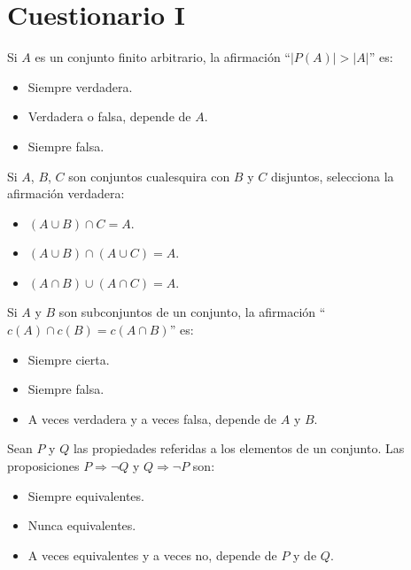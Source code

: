 \section{Cuestionario I}
\begin{ejercicio}
    Si $A$ es un conjunto finito arbitrario, la afirmación ``$|P(A)| > |A|$'' es:
    \begin{itemize}
        \item Siempre verdadera.
        \item Verdadera o falsa, depende de $A$.
        \item Siempre falsa.
    \end{itemize}
\end{ejercicio}

\begin{ejercicio}
    Si $A$, $B$, $C$ son conjuntos cualesquira con $B$ y $C$ disjuntos, selecciona la afirmación verdadera:
    \begin{itemize}
        \item $(A \cup B)\cap C = A$.
        \item $(A \cup B)\cap (A \cup C)=A$.
        \item $(A\cap B)\cup(A \cap C)=A$.
    \end{itemize}
\end{ejercicio}

\begin{ejercicio}
    Si $A$ y $B$ son subconjuntos de un conjunto, la afirmación \newline ``$c(A) \cap c(B) = c(A \cap B)$'' es:
    \begin{itemize}
        \item Siempre cierta.
        \item Siempre falsa.
        \item A veces verdadera y a veces falsa, depende de $A$ y $B$.
    \end{itemize}
\end{ejercicio}

\begin{ejercicio}
    Sean $P$ y $Q$ las propiedades referidas a los elementos de un conjunto. Las proposiciones $P \Rightarrow \neg Q$ y $Q \Rightarrow \neg P$ son:
    \begin{itemize}
        \item Siempre equivalentes.
        \item Nunca equivalentes.
        \item A veces equivalentes y a veces no, depende de $P$ y de $Q$.
    \end{itemize}
\end{ejercicio}

